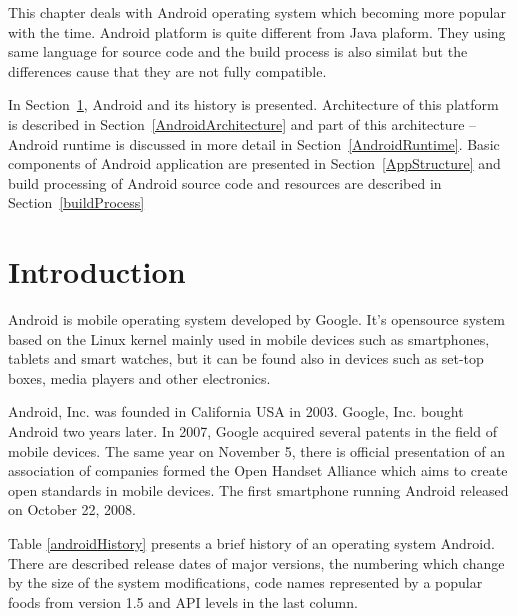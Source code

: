 This chapter deals with Android operating system which becoming more popular with the time. Android platform is quite different from Java plaform. They using same language for source code and the build process is also similat but the differences cause that they are not fully compatible.

In Section~\ref{AndroidIntroduction}, Android and its history is presented. Architecture of this platform is described in Section~\ref{AndroidArchitecture} and part of this architecture -- Android runtime is discussed in more detail in Section~\ref{AndroidRuntime}. Basic components of Android application are presented in Section~\ref{AppStructure} and build processing of Android source code and resources are described in Section~\ref{buildProcess}

\section{Introduction}\label{AndroidIntroduction}
Android is mobile operating system developed by Google. It's opensource system based on the Linux kernel mainly used in mobile devices such as smartphones, tablets and smart watches, but it can be found also in devices such as set-top boxes, media players and other electronics.

Android, Inc. was founded in California USA in 2003. Google, Inc. bought Android two years later. In 2007, Google acquired several patents in the field of mobile devices. The same year on November 5, there is official presentation of an association of companies formed the Open Handset Alliance which aims to create open standards in mobile devices. The first smartphone running Android released on October 22, 2008.

Table \ref{androidHistory} presents a brief history of an operating system Android. There are described release dates of major versions, the numbering which change by the size of the system modifications, code names represented by a popular foods from version 1.5 and API levels in the last column.

